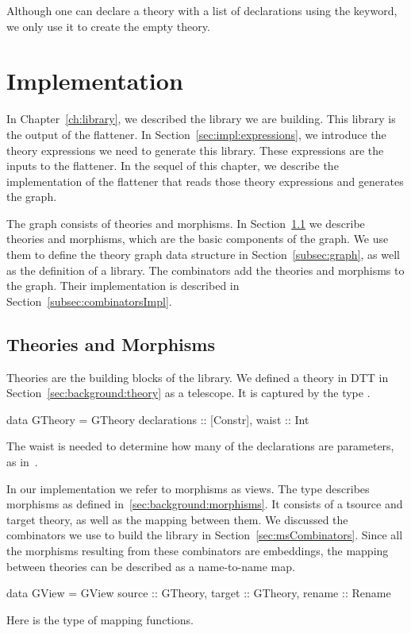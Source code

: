 Although one can declare a theory with a list of declarations using the  keyword, we only use it to create the empty theory. 


\section{Implementation}
\label{subsec:theoriesMorphisms}
In Chapter~\ref{ch:library}, we described the library we are building. This library is the output of the flattener. In Section~\ref{sec:impl:expressions}, we introduce the theory expressions we need to generate this library. These expressions are the inputs to the flattener. In the sequel of this chapter, we describe the implementation of the flattener that reads those theory expressions and generates the graph. 

The graph consists of theories and morphisms. In Section~\ref{sec:impl:Theories} we describe theories and morphisms, which are the basic components of the graph. We use them to define the theory graph data structure in Section~\ref{subsec:graph}, as well as the definition of a library. The combinators add the theories and morphisms to the graph. Their implementation is described in Section~\ref{subsec:combinatorsImpl}. 

\subsection{Theories and Morphisms}
\label{sec:impl:Theories}
Theories are the building blocks of the library. We defined a theory in DTT in Section~\ref{sec:background:theory} as a telescope.  It is captured by the type . 
\begin{hscode}
data GTheory = GTheory {
  declarations :: [Constr],
  waist        :: Int     }
\end{hscode}
The waist is needed to determine how many of the declarations are parameters, as in~\cite{alhassy2019}. 

In our implementation we refer to morphisms as views. The type  describes morphisms as defined in~\ref{sec:background:morphisms}. It consists of a tsource and target theory, as well as the mapping between them. We discussed the combinators we use to build the library in Section~\ref{sec:msCombinators}. Since all the morphisms resulting from these combinators are embeddings, the mapping between theories can be described as a name-to-name map. 
\begin{hscode}
data GView  = GView {
  source  :: GTheory,
  target  :: GTheory,
  rename  :: Rename }  
\end{hscode}
\noindent Here  is the type of mapping functions. 

